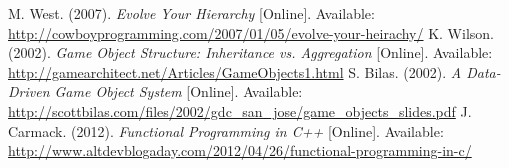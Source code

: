 \begin{thebibliography}{1}
M. West. (2007). \emph{Evolve Your Hierarchy} [Online]. Available: \url{http://cowboyprogramming.com/2007/01/05/evolve-your-heirachy/}
K. Wilson. (2002). \emph{Game Object Structure: Inheritance vs. Aggregation} [Online]. Available: \url{http://gamearchitect.net/Articles/GameObjects1.html}
S. Bilas. (2002). \emph{A Data-Driven Game Object System} [Online]. Available: \url{http://scottbilas.com/files/2002/gdc_san_jose/game_objects_slides.pdf}
J. Carmack. (2012). \emph{Functional Programming in C++} [Online]. Available: \url{http://www.altdevblogaday.com/2012/04/26/functional-programming-in-c/}
\end{thebibliography}
